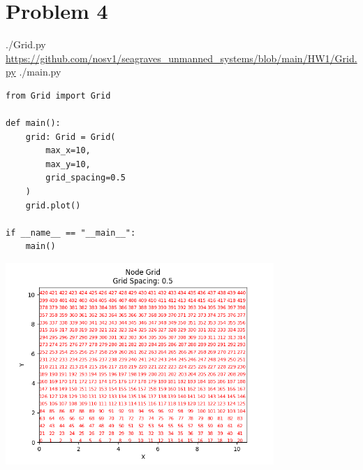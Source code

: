 \documentclass{article}
\begin{document}

    \section*{Problem 4}
        \begin{minipage}{\linewidth}
            \raggedright
            ./Grid.py \break
            \url{https://github.com/nosv1/seagraves_unmanned_systems/blob/main/HW1/Grid.py} \break \break
            ./main.py
            \begin{lstlisting}
from Grid import Grid

def main():
    grid: Grid = Grid(
        max_x=10,
        max_y=10,
        grid_spacing=0.5
    )
    grid.plot()

if __name__ == "__main__":
    main()
            \end{lstlisting}
        \end{minipage}
        \includegraphics[height=3in]{node_grid.png}

\end{document}
